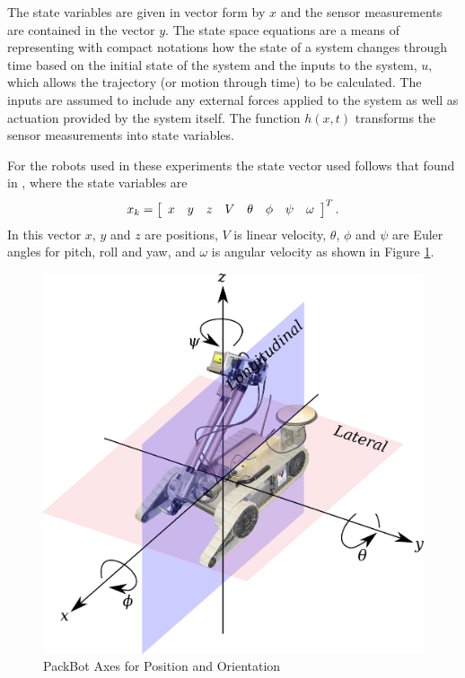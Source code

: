 The state variables are given in vector form by $x$ and the sensor measurements are contained in the vector $y$. The state space equations are a means of representing with compact notations how the state of a system changes through time based on the initial state of the system and the inputs to the system, $u$, which allows the trajectory (or motion through time) to be calculated. The inputs are assumed to include any external forces applied to the system as well as actuation provided by the system itself. The function $h(x,t)$ transforms the sensor measurements into state variables.

For the robots used in these experiments the state vector used follows that found in \cite{Kelly_1994_338}, \cite{Kelly_1994_333} where the state variables are
\begin{align*}
x_k = \left[\begin{array}{c c c c c c c c} x & y & z & V & \theta & \phi & \psi & \omega \end{array}\right]^T.
\end{align*}
In this vector $x$, $y$ and $z$ are positions, $V$ is linear velocity, $\theta$, $\phi$ and $\psi$ are Euler angles for pitch, roll and yaw, and $\omega$ is angular velocity as shown in Figure \ref{fig:packbotaxes}.

\begin{figure}[ht!]
    \centering
    \includegraphics[width=.8\textwidth]{images/packbotaxes}
    \caption{PackBot Axes for Position and Orientation}
    \label{fig:packbotaxes}
\end{figure}

